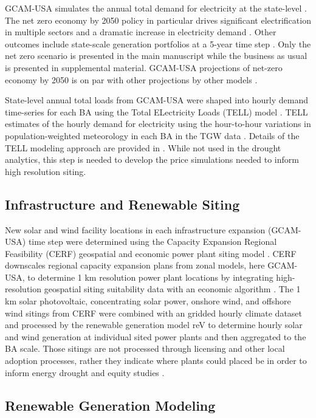\documentclass{agujournal2019}
\begin{document}
GCAM-USA simulates the annual total demand for electricity at the state-level \cite{Khan_2021,Binsted2022}. The net zero economy by 2050 policy in particular drives significant electrification in multiple sectors and a dramatic increase in electricity demand \cite{Ou2023}. Other outcomes include state-scale generation portfolios at a 5-year time step \cite{Ou2023}. Only the net zero scenario is presented in the main manuscript while the business as usual is presented in supplemental material. GCAM-USA projections of net-zero economy by 2050 is on par with other projections by other models \cite{Browning_2023}.  

State-level annual total loads from GCAM-USA were shaped into hourly demand time-series for each BA using the Total ELectricity Loads (TELL) model \cite{McGrath2022}. TELL estimates of the hourly demand for electricity using the hour-to-hour variations in population-weighted meteorology in each BA in the TGW data \cite{Burleyson2023}. Details of the TELL modeling approach are provided in \cite{Burleyson2024}. While not used in the drought analytics, this step is needed to develop the price simulations needed to inform high resolution siting.  

\subsection{Infrastructure and Renewable Siting}
New solar and wind facility locations in each infrastructure expansion (GCAM-USA) time step were determined using the Capacity Expansion Regional Feasibility (CERF) geospatial and economic power plant siting model \cite{Vernon_2021}. CERF downscales regional capacity expansion plans from zonal models, here GCAM-USA, to determine 1 km resolution power plant locations by integrating high-resolution geospatial siting suitability data with an economic algorithm \cite{Vernon_2023,Mongird_2024}. The 1 km solar photovoltaic, concentrating solar power, onshore wind, and offshore wind sitings from CERF were combined with an gridded hourly climate dataset and processed by the renewable generation model reV to determine hourly solar and wind generation at individual sited power plants and then aggregated to the BA scale. Those sitings are not processed through licensing and other local adoption processes, rather they indicate where plants could placed be in order to inform energy drought and equity studies \cite{Mongird2024}. 

\subsection{Renewable Generation Modeling}
\end{document}
